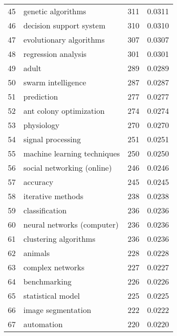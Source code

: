 \begin{tabular}{llrr}
45 &                       genetic algorithms &         311 &      0.0311 \\
46 &                  decision support system &         310 &      0.0310 \\
47 &                  evolutionary algorithms &         307 &      0.0307 \\
48 &                      regression analysis &         301 &      0.0301 \\
49 &                                    adult &         289 &      0.0289 \\
50 &                       swarm intelligence &         287 &      0.0287 \\
51 &                               prediction &         277 &      0.0277 \\
52 &                  ant colony optimization &         274 &      0.0274 \\
53 &                               physiology &         270 &      0.0270 \\
54 &                        signal processing &         251 &      0.0251 \\
55 &              machine learning techniques &         250 &      0.0250 \\
56 &               social networking (online) &         246 &      0.0246 \\
57 &                                 accuracy &         245 &      0.0245 \\
58 &                        iterative methods &         238 &      0.0238 \\
59 &                           classification &         236 &      0.0236 \\
60 &               neural networks (computer) &         236 &      0.0236 \\
61 &                    clustering algorithms &         236 &      0.0236 \\
62 &                                  animals &         228 &      0.0228 \\
63 &                         complex networks &         227 &      0.0227 \\
64 &                             benchmarking &         226 &      0.0226 \\
65 &                        statistical model &         225 &      0.0225 \\
66 &                       image segmentation &         222 &      0.0222 \\
67 &                               automation &         220 &      0.0220 \\

\end{tabular}

